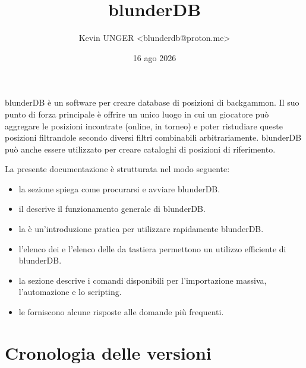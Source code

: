 \documentclass[letterpaper,10pt,italian]{sphinxmanual}
\title{blunderDB}
\date{16 ago 2026}
\author{Kevin UNGER <blunderdb@proton.me>}
\begin{document}
\pagestyle{empty}
\sphinxmaketitle
\pagestyle{plain}
\sphinxtableofcontents
\pagestyle{normal}
\label{\detokenize{index::doc}}


\sphinxAtStartPar
blunderDB è un software per creare database di posizioni di backgammon. Il suo punto di forza principale è offrire un unico luogo in cui un giocatore può aggregare le posizioni incontrate (online, in torneo) e poter ristudiare queste posizioni filtrandole secondo diversi filtri combinabili arbitrariamente. blunderDB può anche essere utilizzato per creare cataloghi di posizioni di riferimento.

\sphinxAtStartPar
La presente documentazione è strutturata nel modo seguente:
\begin{itemize}
\item {} 
\sphinxAtStartPar
la sezione  spiega come procurarsi e avviare blunderDB.

\item {} 
\sphinxAtStartPar
il  descrive il funzionamento generale di blunderDB.

\item {} 
\sphinxAtStartPar
la  è un’introduzione pratica per utilizzare rapidamente blunderDB.

\item {} 
\sphinxAtStartPar
l’elenco dei  e l’elenco delle  da tastiera permettono un utilizzo efficiente di blunderDB.

\item {} 
\sphinxAtStartPar
la sezione  descrive i comandi disponibili per l’importazione massiva, l’automazione e lo scripting.

\item {} 
\sphinxAtStartPar
le  forniscono alcune risposte alle domande più frequenti.

\end{itemize}


\chapter{Cronologia delle versioni}
\label{\detokenize{index:historique-des-versions}}
\end{document}
